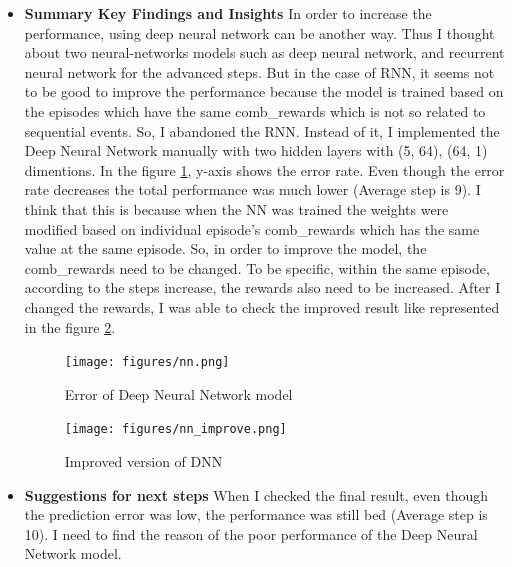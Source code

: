 \documentclass[12pt]{article}
\begin{document}
\begin{itemize}
\item \textbf{Summary Key Findings and Insights}
In order to increase the performance, using deep neural network can be another way. Thus I thought about two neural-networks models such as deep neural network, and recurrent neural network for the advanced steps. But in the case of RNN, it seems not to be good to improve the performance because the model is trained based on the episodes which have the same comb\_rewards which is not so related to sequential events. So, I abandoned the RNN. Instead of it, I implemented the Deep Neural Network manually with two hidden layers with (5, 64), (64, 1) dimentions. In the figure \ref{nn}, y-axis shows the error rate. Even though the error rate decreases the total performance was much lower (Average step is 9). I think that this is because when the NN was trained the weights were modified based on individual episode's comb\_rewards which has the same value at the same episode. So, in order to improve the model, the comb\_rewards need to be changed. To be specific, within the same episode, according to the steps increase, the rewards also need to be increased. After I changed the rewards, I was able to check the improved result like represented in the figure \ref{nn_improve}.

\begin{figure}[H]
  \centering
  \texttt{[image: figures/nn.png]}
  \caption{Error of Deep Neural Network model}\label{nn}
\end{figure}

\begin{figure}[H]
  \centering
  \texttt{[image: figures/nn\_improve.png]}
  \caption{Improved version of DNN}\label{nn_improve}
\end{figure}

\item \textbf{Suggestions for next steps}
When I checked the final result, even though the prediction error was low, the performance was still bed (Average step is 10). I need to find the reason of the poor performance of the Deep Neural Network model.

\end{itemize}
\end{document}

